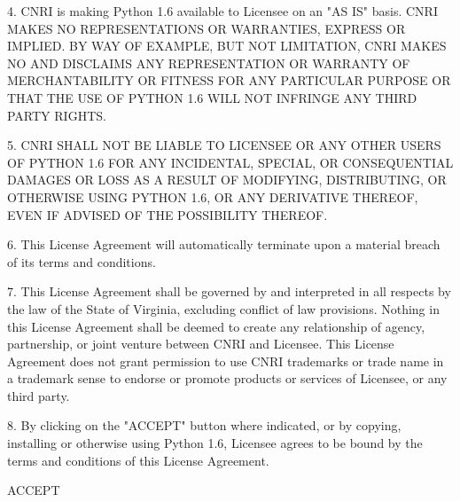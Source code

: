 4. CNRI is making Python 1.6 available to Licensee on an "AS IS"
basis.  CNRI MAKES NO REPRESENTATIONS OR WARRANTIES, EXPRESS OR
IMPLIED.  BY WAY OF EXAMPLE, BUT NOT LIMITATION, CNRI MAKES NO AND
DISCLAIMS ANY REPRESENTATION OR WARRANTY OF MERCHANTABILITY OR FITNESS
FOR ANY PARTICULAR PURPOSE OR THAT THE USE OF PYTHON 1.6 WILL NOT
INFRINGE ANY THIRD PARTY RIGHTS.

5. CNRI SHALL NOT BE LIABLE TO LICENSEE OR ANY OTHER USERS OF PYTHON
1.6 FOR ANY INCIDENTAL, SPECIAL, OR CONSEQUENTIAL DAMAGES OR LOSS AS A
RESULT OF MODIFYING, DISTRIBUTING, OR OTHERWISE USING PYTHON 1.6, OR
ANY DERIVATIVE THEREOF, EVEN IF ADVISED OF THE POSSIBILITY THEREOF.

6. This License Agreement will automatically terminate upon a material
breach of its terms and conditions.

7. This License Agreement shall be governed by and interpreted in all
respects by the law of the State of Virginia, excluding conflict of
law provisions.  Nothing in this License Agreement shall be deemed to
create any relationship of agency, partnership, or joint venture
between CNRI and Licensee.  This License Agreement does not grant
permission to use CNRI trademarks or trade name in a trademark sense
to endorse or promote products or services of Licensee, or any third
party.

8. By clicking on the "ACCEPT" button where indicated, or by copying,
installing or otherwise using Python 1.6, Licensee agrees to be bound
by the terms and conditions of this License Agreement.

        ACCEPT
